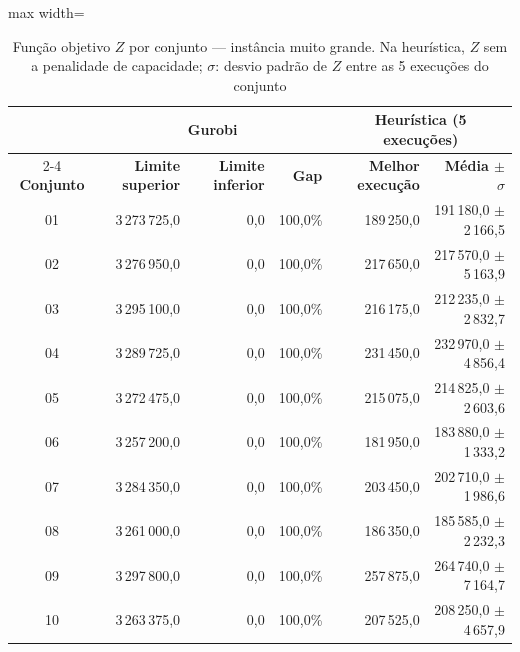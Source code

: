\begin{table}[htbp]
    \caption{Função objetivo $Z$ por conjunto --- instância muito grande. Na heurística, $Z$ sem a penalidade de capacidade; $\sigma$: desvio padrão de $Z$ entre as 5 execuções do conjunto}
    \label{tab:res-z-muito-grande}
    \centering
    \begin{adjustbox}{max width=\textwidth}
    \begin{tabular}{crrrrr}
        \hline
        & \multicolumn{3}{c}{\textbf{Gurobi}} & \multicolumn{2}{c}{\textbf{Heurística (5 execuções)}} \\
        \cline{2-4} \cline{5-6}
        \textbf{Conjunto} & \textbf{Limite superior} & \textbf{Limite inferior} & \textbf{Gap} & \textbf{Melhor execução} & \textbf{Média $\pm$ $\sigma$} \\
        \hline
        01 & 3\,273\,725,0 & 0,0 & 100,0\% & 189\,250,0 & 191\,180,0 $\pm$ 2\,166,5 \\
        02 & 3\,276\,950,0 & 0,0 & 100,0\% & 217\,650,0 & 217\,570,0 $\pm$ 5\,163,9 \\
        03 & 3\,295\,100,0 & 0,0 & 100,0\% & 216\,175,0 & 212\,235,0 $\pm$ 2\,832,7 \\
        04 & 3\,289\,725,0 & 0,0 & 100,0\% & 231\,450,0 & 232\,970,0 $\pm$ 4\,856,4 \\
        05 & 3\,272\,475,0 & 0,0 & 100,0\% & 215\,075,0 & 214\,825,0 $\pm$ 2\,603,6 \\
        06 & 3\,257\,200,0 & 0,0 & 100,0\% & 181\,950,0 & 183\,880,0 $\pm$ 1\,333,2 \\
        07 & 3\,284\,350,0 & 0,0 & 100,0\% & 203\,450,0 & 202\,710,0 $\pm$ 1\,986,6 \\
        08 & 3\,261\,000,0 & 0,0 & 100,0\% & 186\,350,0 & 185\,585,0 $\pm$ 2\,232,3 \\
        09 & 3\,297\,800,0 & 0,0 & 100,0\% & 257\,875,0 & 264\,740,0 $\pm$ 7\,164,7 \\
        10 & 3\,263\,375,0 & 0,0 & 100,0\% & 207\,525,0 & 208\,250,0 $\pm$ 4\,657,9 \\
        \hline
    \end{tabular}
    \end{adjustbox}
\end{table}


